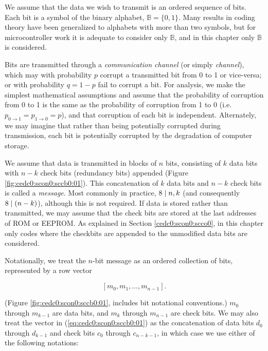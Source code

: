 We assume that the data we wish to transmit is an ordered sequence of bits.
Each bit is a symbol of the binary alphabet, 
$\mathbb{B} = \{0,1\}$.  Many results in coding theory have been generalized to
alphabets with more than two symbols, but for microcontroller work it is adequate
to consider only $\mathbb{B}$, and in this chapter only
$\mathbb{B}$ is considered.

Bits are transmitted through a %
\emph{communication channel} (or simply \emph{channel}), which may with probability $p$
corrupt a transmitted bit from 0 to 1 or vice-versa; or with
probability $q=1-p$ fail to corrupt a bit.  For analysis,
we make the simplest mathematical assumptions and assume that 
the probability of corruption from 0 to 1 is the same as the probability
of corruption from 1 to 0 (i.e. $p_{0\rightarrow{}1} = p_{1\rightarrow{}0} = p$),
and that corruption of each bit is independent.  Alternately, we may imagine that rather
than being potentially corrupted during transmission, each bit is potentially 
corrupted by the degradation of computer storage.

We assume that data is transmitted in blocks of 
$n$ bits, consisting of $k$ data bits with $n-k$ check bits
(redundancy bits) appended (Figure \ref{fig:cedc0:scon0:sccb0:01}).  This concatenation of
$k$ data bits and $n-k$ check bits is called a \emph{message}.
Most commonly
in practice, $8 \mid n,k$ (and consequently
$8 \mid (n-k)$), although this is not required.
If data is stored rather than transmitted, we may assume that
the check bits are stored at the last addresses of ROM or EEPROM.
As explained in Section \ref{cedc0:scon0:scco0},
in this chapter only codes where the checkbits are appended to the unmodified
data bits are considered.

Notationally, we treat the $n$-bit message as an ordered collection of
bits, represented by a row vector

\begin{equation}
\label{eq:cedc0:scon0:sccb0:01}
[m_0, m_1, \ldots{}, m_{n-1}] .
\end{equation}

\noindent{}(Figure \ref{fig:cedc0:scon0:sccb0:01},
includes bit notational conventions.)  $m_0$ through $m_{k-1}$ are data bits, and
$m_k$ through $m_{n-1}$ are check bits.  We may also 
treat the vector in (\ref{eq:cedc0:scon0:sccb0:01}) as 
the concatenation of data bits $d_0$ through $d_{k-1}$ and
check bits $c_0$ through $c_{n-k-1}$, in which case we use 
either of the following notations:

